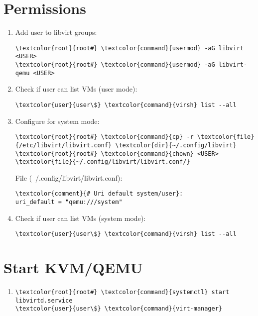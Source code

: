 \documentclass[10pt, a4paper, onecolumn, openany]{book} %
\begin{document}
\section{Permissions}
\begin{enumerate}
    \item Add user to libvirt groups:
\begin{Verbatim}[commandchars=\\\{\}]
\textcolor{root}{root#} \textcolor{command}{usermod} -aG libvirt <USER>
\textcolor{root}{root#} \textcolor{command}{usermod} -aG libvirt-qemu <USER>
\end{Verbatim}
    \item Check if user can list VMs (user mode):
\begin{Verbatim}[commandchars=\\\{\}]
\textcolor{user}{user\$} \textcolor{command}{virsh} list --all
\end{Verbatim}
    \item Configure for system mode:
\begin{Verbatim}[commandchars=\\\{\}]
\textcolor{root}{root#} \textcolor{command}{cp} -r \textcolor{file}{/etc/libvirt/libvirt.conf} \textcolor{dir}{~/.config/libvirt}
\textcolor{root}{root#} \textcolor{command}{chown} <USER> \textcolor{file}{~/.config/libvirt/libvirt.conf/}
\end{Verbatim}
File (\textcolor{file}{~/.config/libvirt/libvirt.conf}):
\begin{Verbatim}[commandchars=\\\{\}]
\textcolor{comment}{# Uri default system/user}:
uri_default = "qemu:///system"
\end{Verbatim}
    \item Check if user can list VMs (system mode):
\begin{Verbatim}[commandchars=\\\{\}]
\textcolor{user}{user\$} \textcolor{command}{virsh} list --all
\end{Verbatim}
\end{enumerate}
\section{Start KVM/QEMU}
\begin{enumerate}
    \item 
\begin{Verbatim}[commandchars=\\\{\}]
\textcolor{root}{root#} \textcolor{command}{systemctl} start libvirtd.service
\textcolor{user}{user\$} \textcolor{command}{virt-manager}
\end{Verbatim}
\end{enumerate}
\end{document}
